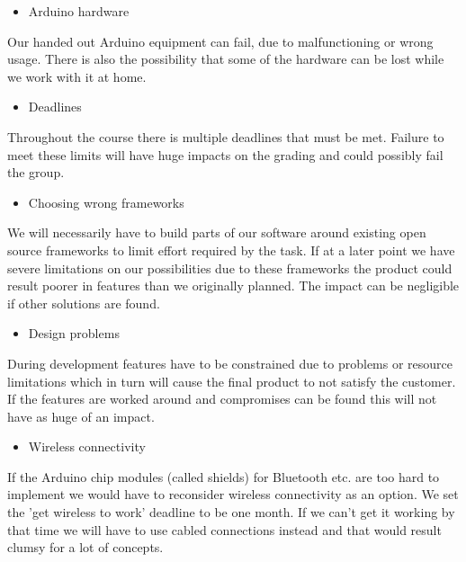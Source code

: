 \begin{itemize}
\item Arduino hardware
\end{itemize}
Our handed out Arduino equipment can fail, due to malfunctioning or wrong usage.
There is also the possibility that some of the hardware can be lost while we work with it at home.

\begin{itemize}
\item Deadlines
\end{itemize}
Throughout the course there is multiple deadlines that must be met. Failure to meet
these limits will have huge impacts on the grading and could possibly fail the group.

\begin{itemize}
\item Choosing wrong frameworks
\end{itemize}
We will necessarily have to build parts of our software around existing open source
frameworks to limit effort required by the task. If at a later point we have severe limitations
on our possibilities due to these frameworks the product could result poorer in features than
we originally planned. The impact can be negligible if other solutions are found.

\begin{itemize}
\item Design problems
\end{itemize}
During development features have to be constrained due to problems or resource limitations
which in turn will cause the final product to not satisfy the customer. If the features are
worked around and compromises can be found this will not have as huge of an impact.

\begin{itemize}
\item Wireless connectivity
\end{itemize}
If the Arduino chip modules (called shields) for Bluetooth etc. are too hard to implement
we would have to reconsider wireless connectivity as an option.
We set the 'get wireless to work' deadline to be one month. If we can't get it working
by that time we will have to use cabled connections instead and that would result clumsy
for a lot of concepts.

